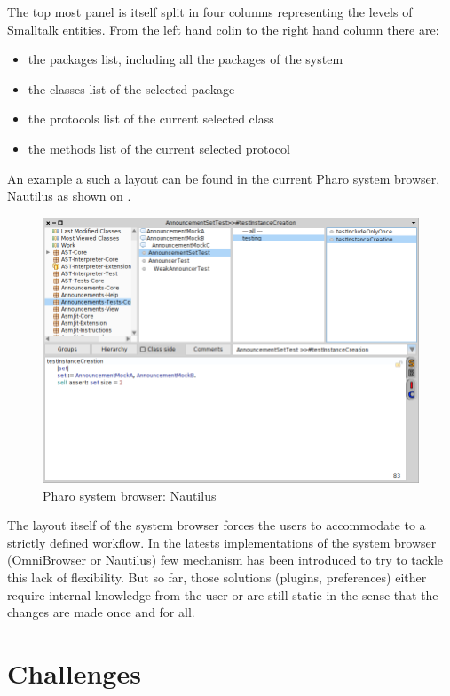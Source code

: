 \documentclass[12pt]{article}
\begin{document}
The top most panel is itself split in four columns representing the levels of Smalltalk entities.
From the left hand colin to the right hand column there are:
\begin{itemize}
	\item the packages list, including all the packages of the system
	\item the classes list of the selected package
	\item the protocols list of the current selected class
	\item the methods list of the current selected protocol
\end{itemize}

An example a such a layout can be found in the current Pharo system browser, Nautilus as shown on .
\begin{figure}[ht]
\begin{center}
     \includegraphics[width=15cm]{figures/Nautilus}
\end{center}
     \caption{Pharo system browser: Nautilus}
\end{figure}

The layout itself of the system browser forces the users to accommodate to a strictly defined workflow.
In the latests implementations of the system browser (OmniBrowser or Nautilus) few mechanism has been introduced to try to tackle this lack of flexibility.
But so far, those solutions (plugins, preferences) either require internal knowledge from the user or are still static in the sense that the changes are made once and for all.

\section{Challenges}
\end{document}
